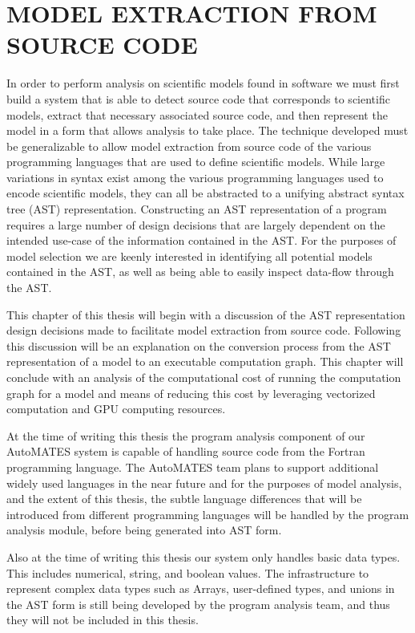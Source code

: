 \chapter{MODEL EXTRACTION FROM SOURCE CODE\label{chapter:extraction}}
In order to perform analysis on scientific models found in software we must first build a system that is able to detect source code that corresponds to scientific models, extract that necessary associated source code, and then represent the model in a form that allows analysis to take place. The technique developed must be generalizable to allow model extraction from source code of the various programming languages that are used to define scientific models. While large variations in syntax exist among the various programming languages used to encode scientific models, they can all be abstracted to a unifying abstract syntax tree (AST) representation. Constructing an AST representation of a program requires a large number of design decisions that are largely dependent on the intended use-case of the information contained in the AST. For the purposes of model selection we are keenly interested in identifying all potential models contained in the AST, as well as being able to easily inspect data-flow through the AST.

This chapter of this thesis will begin with a discussion of the AST representation design decisions made to facilitate model extraction from source code. Following this discussion will be an explanation on the conversion process from the AST representation of a model to an executable computation graph. This chapter will conclude with an analysis of the computational cost of running the computation graph for a model and means of reducing this cost by leveraging vectorized computation and GPU computing resources.

At the time of writing this thesis the program analysis component of our AutoMATES system is capable of handling source code from the Fortran programming language. The AutoMATES team plans to support additional widely used languages in the near future and for the purposes of model analysis, and the extent of this thesis, the subtle language differences that will be introduced from different programming languages will be handled by the program analysis module, before being generated into AST form.

Also at the time of writing this thesis our system only handles basic data types. This includes numerical, string, and boolean values. The infrastructure to represent complex data types such as Arrays, user-defined types, and unions in the AST form is still being developed by the program analysis team, and thus they will not be included in this thesis.


